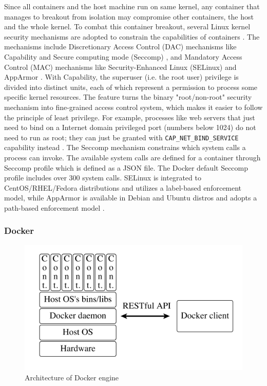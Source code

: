 \documentclass[english, 12pt, a4paper, sci, utf8, a-2b, online]{aaltothesis}
\begin{document}
Since all containers and the host machine run on same kernel, any container that manages to breakout from isolation may compromise other containers, the host and the whole kernel. To combat this container breakout, several Linux kernel security mechanisms are adopted to constrain the capabilities of containers \cite{lin2018measurement}. The mechanisms include Discretionary Access Control (DAC) mechanisms like Capability \cite{manpages-capabilities} and Secure computing mode (Seccomp) \cite{manpages-seccomp}, and Mandatory Access Control (MAC) mechanisms like Security-Enhanced Linux (SELinux) and AppArmor \cite{apparmor}. With Capability, the superuser (i.e. the root user) privilege is divided into distinct units, each of which represent a permission to process some specific kernel resources. The feature turns the binary "root/non-root" security mechanism into fine-grained access control system, which makes it easier to follow the principle of least privilege. For example, processes like web servers that just need to bind on a Internet domain privileged port (numbers below 1024) do not need to run as root; they can just be granted with \texttt{CAP\_NET\_BIND\_SERVICE} capability instead \cite{docker-security}. The Seccomp mechanism constrains which system calls a process can invoke. The available system calls are defined for a container through Seccomp profile which is defined as a JSON file. The Docker default Seccomp profile \cite{docker-default-seccomp} includes over 300 system calls. SELinux is integrated to CentOS/RHEL/Fedora distributions and utilizes a label-based enforcement model, while AppArmor is available in Debian and Ubuntu distros and adopts a path-based enforcement model \cite{lin2018measurement}.

\subsubsection{Docker}

\begin{figure}[h!]
  \centering
  \includegraphics[width=\linewidth]{files/docker-engine.png}
  \caption{Architecture of Docker engine \cite{bui2015analysis}}
  \label{figure-docker}
\end{figure}
\end{document}

